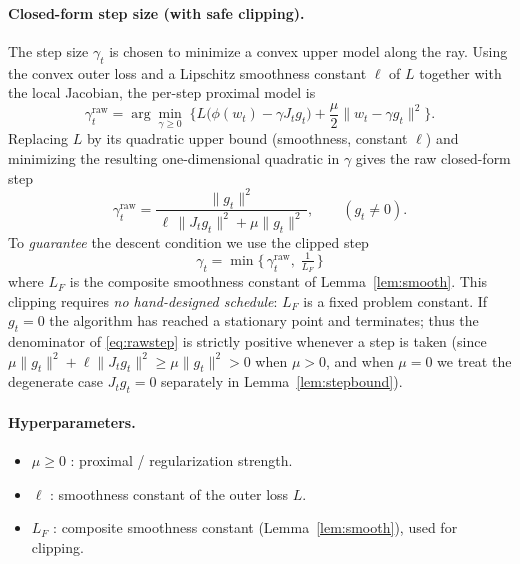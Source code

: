 \documentclass[11pt]{article}
\begin{document}
\paragraph{Closed-form step size (with safe clipping).}
The step size $\gamma_t$ is chosen to minimize a convex upper model along the
ray. Using the convex outer loss and a Lipschitz smoothness constant $\ell$ of
$L$ together with the local Jacobian, the per-step proximal model is
\begin{equation}
\gamma_t^{\mathrm{raw}} = \arg\min_{\gamma \ge 0}
\; \Big\{ L\big(\phi(w_t) - \gamma J_t g_t\big)
+ \frac{\mu}{2}\|w_t - \gamma g_t\|^2 \Big\}.
\label{eq:stepsub}
\end{equation}
Replacing $L$ by its quadratic upper bound (smoothness, constant $\ell$) and
minimizing the resulting one-dimensional quadratic in $\gamma$ gives the
raw closed-form step
\begin{equation}
\gamma_t^{\mathrm{raw}} = \frac{\|g_t\|^2}{\,\ell\,\|J_t g_t\|^2 + \mu \|g_t\|^2\,},
\qquad (g_t \ne 0).
\label{eq:rawstep}
\end{equation}
To \emph{guarantee} the descent condition we use the clipped step
\begin{equation}
\boxed{\;
\gamma_t = \min\!\Big\{\, \gamma_t^{\mathrm{raw}},\; \tfrac{1}{L_F} \,\Big\}
\;}
\label{eq:closedstep}
\end{equation}
where $L_F$ is the composite smoothness constant of Lemma~\ref{lem:smooth}.
This clipping requires \emph{no hand-designed schedule}: $L_F$ is a fixed
problem constant. If $g_t = 0$ the algorithm has reached a stationary point and
terminates; thus the denominator of \eqref{eq:rawstep} is strictly positive
whenever a step is taken (since $\mu\|g_t\|^2 + \ell\|J_t g_t\|^2 \ge
\mu\|g_t\|^2 > 0$ when $\mu>0$, and when $\mu=0$ we treat the degenerate case
$J_t g_t = 0$ separately in Lemma~\ref{lem:stepbound}).

\paragraph{Hyperparameters.}
\begin{itemize}
  \item $\mu \ge 0$ : proximal / regularization strength.
  \item $\ell$ : smoothness constant of the outer loss $L$.
  \item $L_F$ : composite smoothness constant (Lemma~\ref{lem:smooth}), used for
        clipping.
\end{itemize}
\end{document}

